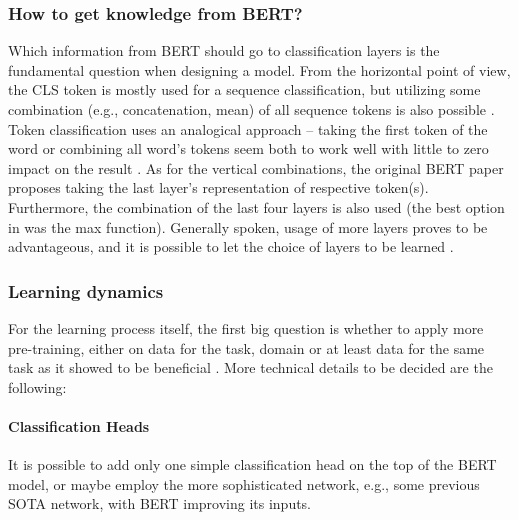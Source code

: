 \subsubsection{How to get knowledge from BERT?}
Which information from BERT should go to classification layers is the fundamental question when designing a model. From the horizontal point of view, the CLS token  is mostly used for a sequence classification, but utilizing some combination (e.g., concatenation, mean) of all sequence tokens is also possible \citep{Rogers2020}. Token classification uses an analogical approach -- taking the first token of the word or combining all word's tokens seem both to work well with little to zero impact on the result \citep{Kondratyuk2019, Kitaev2018}. As for the vertical combinations, the original BERT paper proposes taking the last layer's representation of respective token(s). Furthermore, the combination of the last four layers is also used (the best option in \citet{Sun} was the max function). Generally spoken, usage of more layers proves to be advantageous, and it is possible to let the choice of layers to be learned \citep{Yang2019b, Kondratyuk2019}.
\subsubsection{Learning dynamics}
For the learning process itself, the first big question is whether to apply more pre-training, either on data for the task, domain or at least data for the same task as it showed to be beneficial \citep{Sun}. More technical details to be decided are the following:

\paragraph{Classification Heads} It is possible to add only one simple classification head on the top of the BERT model, or maybe employ the more sophisticated network, e.g., some previous SOTA network, with BERT improving its inputs.
